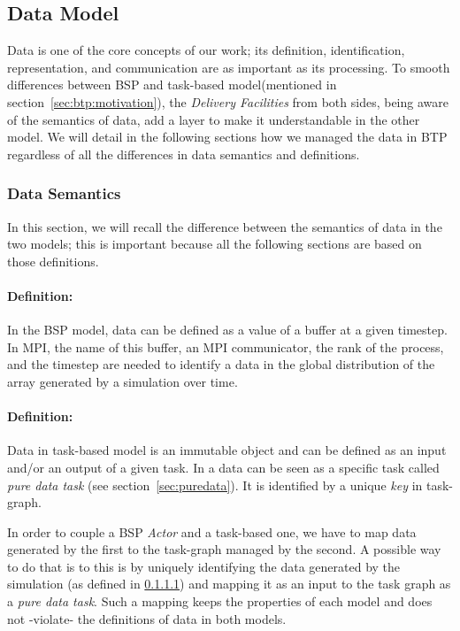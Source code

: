 \subsection{Data Model}\label{sec:btpImp:datamodel}
Data is one of the core concepts of our work; its definition, identification, representation, and communication are as important as its processing. To smooth  differences between BSP and task-based model(mentioned in section~\ref{sec:btp:motivation}), the \textit{Delivery Facilities} from both sides, being aware of the semantics of data, add a layer to make it understandable in the other model. We will detail in the following sections how we managed the data in BTP regardless of all the differences in data semantics and definitions.

\subsubsection{Data Semantics}\label{sec:datamodel:datasemantic}

In this section, we will recall the difference between the semantics of data in the two models; this is important because all the following sections are based on those definitions.

\paragraph{Definition:}\label{defdataBSP}
In the BSP model, data can be defined as a value of a buffer at a given timestep. In MPI, the name of this buffer, an MPI communicator, the rank of the process, and the timestep are needed to identify a data in the global distribution of the array generated by a simulation over time. 

\paragraph{Definition:}\label{defdatataskbased}
Data in task-based model is an immutable object and can be defined as an input and/or an output of a given task. In \dask a data can be seen as a specific task called \textit{pure data task} (see section~\ref{sec:puredata}). It is identified by a unique \textit{key} in \dask task-graph. 

In order to couple a BSP \textit{Actor} and a task-based one, we have to map data generated by the first to the task-graph managed by the second.
A possible way to do that is to this is by uniquely identifying the data generated by the simulation (as defined in \ref{defdataBSP}) and mapping it as an input to the task graph as a \textit{pure data task}. Such a mapping keeps the properties of each model and does not -violate- the definitions of data in both models.


